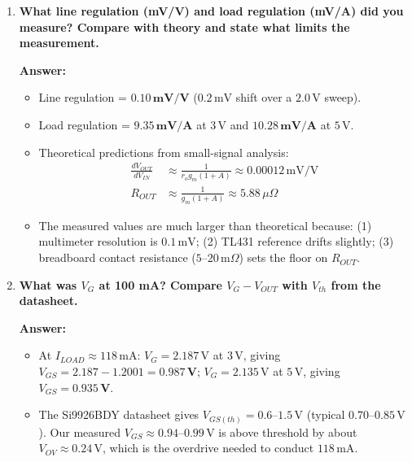 \documentclass[11pt,a4paper]{article}
\begin{document}
\begin{enumerate}[label=\textbf{Q\arabic*.}, leftmargin=2.0em, itemsep=0.8em]
    \item \textbf{What line regulation (mV/V) and load regulation (mV/A) did you measure? Compare with theory and state what limits the measurement.}

    \textbf{Answer:}
    \begin{itemize}[leftmargin=1.2em, itemsep=0.1em]
        \item Line regulation = $\mathbf{0.10\,\text{mV/V}}$ ($0.2\,\text{mV}$ shift over a $2.0\,\text{V}$ sweep).
        \item Load regulation = $\mathbf{9.35\,\text{mV/A}}$ at $3\,\text{V}$ and $\mathbf{10.28\,\text{mV/A}}$ at $5\,\text{V}$.
        \item Theoretical predictions from small-signal analysis:
        \begin{align}
            \frac{dV_{OUT}}{dV_{IN}} &\approx \frac{1}{r_o g_m (1 + A)} \approx 0.00012\,\text{mV/V} \\
            R_{OUT} &\approx \frac{1}{g_m (1 + A)} \approx 5.88\,\mu\Omega
        \end{align}
        \item The measured values are much larger than theoretical because: (1) multimeter resolution is $0.1\,\text{mV}$; (2) TL431 reference drifts slightly; (3) breadboard contact resistance ($5\text{--}20\,\text{m}\Omega$) sets the floor on $R_{OUT}$.
    \end{itemize}

    \item \textbf{What was $V_G$ at 100 mA? Compare $V_G - V_{OUT}$ with $V_{th}$ from the datasheet.}

    \textbf{Answer:}
    \begin{itemize}[leftmargin=1.2em, itemsep=0.1em]
        \item At $I_{LOAD} \approx 118\,\text{mA}$: $V_G = 2.187\,\text{V}$ at $3\,\text{V}$, giving $V_{GS} = 2.187 - 1.2001 = \mathbf{0.987\,\text{V}}$; $V_G = 2.135\,\text{V}$ at $5\,\text{V}$, giving $V_{GS} = \mathbf{0.935\,\text{V}}$.
        \item The Si9926BDY datasheet gives $V_{GS(th)} = 0.6\text{--}1.5\,\text{V}$ (typical $0.70\text{--}0.85\,\text{V}$). Our measured $V_{GS} \approx 0.94\text{--}0.99\,\text{V}$ is above threshold by about $V_{OV} \approx 0.24\,\text{V}$, which is the overdrive needed to conduct $118\,\text{mA}$.
    \end{itemize}


\end{enumerate}
\end{document}
